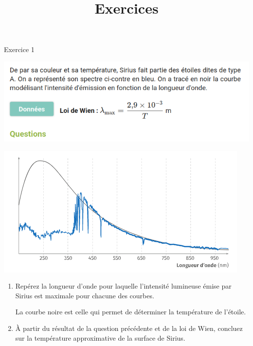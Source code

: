 \documentclass[10pt]{article}
\newcommand{\titreActivite}{\huge Exercices} %
\begin{document}
\date{}
\title{\titreActivite}
\maketitle %

\begin{center}
	Exercice 1
\end{center}


\begin{minipage}[c]{0.45\textwidth}
	\includegraphics[scale=0.45]{doc.png}
\end{minipage}
\hspace{0.1\textwidth}
\begin{minipage}[c]{0.45\textwidth}
	\includegraphics[scale=0.45]{graph.png}
\end{minipage}


\begin{enumerate}
	\item  Repérez la longueur d’onde pour laquelle l’intensité lumineuse émise par Sirius est maximale pour chacune des courbes.

	      La courbe noire est celle qui permet de déterminer la température de l'étoile.

	\item  À partir du résultat de la question précédente et de la loi de Wien, concluez sur la température approximative de la surface de Sirius.
\end{enumerate}
\end{document}
